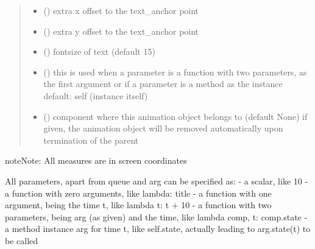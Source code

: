 \documentclass[letterpaper,10pt,english]{sphinxmanual}
\begin{document}
\begin{fulllineitems}
\begin{quote}
\begin{description}
\begin{itemize}
\item {} 
 () \textendash{} extra x offset to the text\_anchor point

\item {} 
 () \textendash{} extra y offset to the text\_anchor point

\item {} 
 () \textendash{} fontsize of text (default 15)

\item {} 
 () \textendash{} this is used when a parameter is a function with two parameters, as the first argument or
if a parameter is a method as the instance 
default: self (instance itself)

\item {} 
 ({\hyperref[\detokenize{Reference:salabim.Component}]{}}) \textendash{} component where this animation object belongs to (default None) 
if given, the animation object will be removed
automatically upon termination of the parent

\end{itemize}

\end{description}\end{quote}

\begin{sphinxadmonition}{note}{Note:}
All measures are in screen coordinates 

All parameters, apart from queue and arg can be specified as: 
- a scalar, like 10 
- a function with zero arguments, like lambda: title 
- a function with one argument, being the time t, like lambda t: t + 10 
- a function with two parameters, being arg (as given) and the time, like lambda comp, t: comp.state 
- a method instance arg for time t, like self.state, actually leading to arg.state(t) to be called
\end{sphinxadmonition}

\end{fulllineitems}

\end{document}
